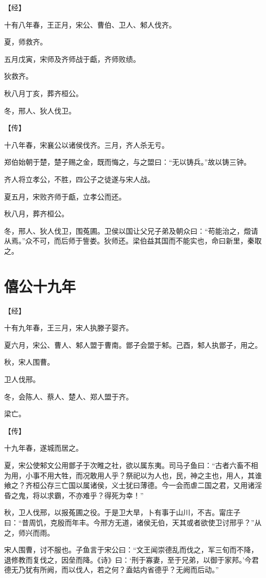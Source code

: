 \documentclass[a4paper,12pt,UTF8,twoside]{ctexbook}
\begin{document}
【经】

十有八年春，王正月，宋公、曹伯、卫人、邾人伐齐。

夏，师救齐。

五月戊寅，宋师及齐师战于甗，齐师败绩。

狄救齐。

秋八月丁亥，葬齐桓公。

冬，邢人、狄人伐卫。

【传】

十八年春，宋襄公以诸侯伐齐。三月，齐人杀无亏。

郑伯始朝于楚，楚子赐之金，既而悔之，与之盟曰：“无以铸兵。”故以铸三钟。

齐人将立孝公，不胜，四公子之徒遂与宋人战。

夏五月，宋败齐师于甗，立孝公而还。

秋八月，葬齐桓公。

冬，邢人、狄人伐卫，围菟圃。卫侯以国让父兄子弟及朝众曰：“苟能治之，燬请从焉。”众不可，而后师于訾娄。狄师还。梁伯益其国而不能实也，命曰新里，秦取之。


\chapter{僖公十九年}

【经】

十有九年春，王三月，宋人执滕子婴齐。

夏六月，宋公、曹人、邾人盟于曹南。鄫子会盟于邾。己酉，邾人执鄫子，用之。

秋，宋人围曹。

卫人伐邢。

冬，会陈人、蔡人、楚人、郑人盟于齐。

梁亡。

【传】

十九年春，遂城而居之。

夏，宋公使邾文公用鄫子于次睢之社，欲以属东夷。司马子鱼曰：“古者六畜不相为用，小事不用大牲，而况敢用人乎？祭祀以为人也，民，神之主也，用人，其谁飨之？齐桓公存三亡国以属诸侯，义士犹曰薄德。今一会而虐二国之君，又用诸淫昏之鬼，将以求霸，不亦难乎？得死为幸！”

秋，卫人伐邢，以报菟圃之役。于是卫大旱，卜有事于山川，不吉。甯庄子曰：“昔周饥，克殷而年丰。今邢方无道，诸侯无伯，天其或者欲使卫讨邢乎？”从之，师兴而雨。

宋人围曹，讨不服也。子鱼言于宋公曰：“文王闻崇德乱而伐之，军三旬而不降，退修教而复伐之，因垒而降。《诗》曰：‘刑于寡妻，至于兄弟，以御于家邦。’今君德无乃犹有所阙，而以伐人，若之何？盍姑内省德乎？无阙而后动。”
\end{document}

